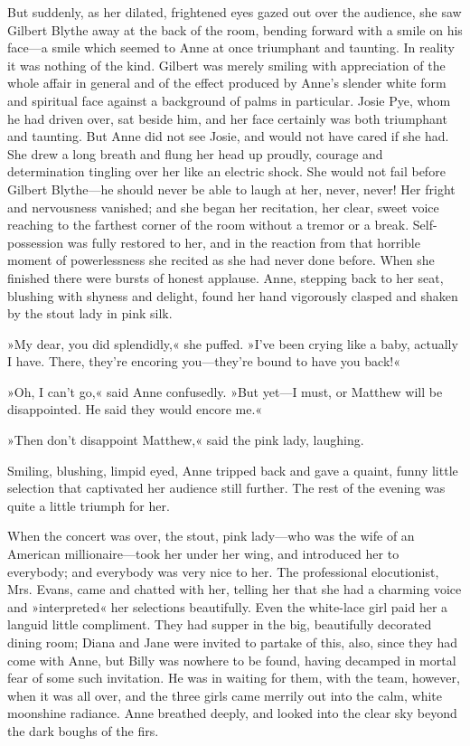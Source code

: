 But suddenly, as her dilated, frightened eyes gazed out over the audience, she saw Gilbert Blythe away at the back of the room, bending forward with a smile on his face—a smile which seemed to Anne at once triumphant and taunting. In reality it was nothing of the kind. Gilbert was merely smiling with appreciation of the whole affair in general and of the effect produced by Anne's slender white form and spiritual face against a background of palms in particular. Josie Pye, whom he had driven over, sat beside him, and her face certainly was both triumphant and taunting. But Anne did not see Josie, and would not have cared if she had. She drew a long breath and flung her head up proudly, courage and determination tingling over her like an electric shock. She would not fail before Gilbert Blythe—he should never be able to laugh at her, never, never! Her fright and nervousness vanished; and she began her recitation, her clear, sweet voice reaching to the farthest corner of the room without a tremor or a break. Self-possession was fully restored to her, and in the reaction from that horrible moment of powerlessness she recited as she had never done before. When she finished there were bursts of honest applause. Anne, stepping back to her seat, blushing with shyness and delight, found her hand vigorously clasped and shaken by the stout lady in pink silk.

»My dear, you did splendidly,« she puffed. »I've been crying like a baby, actually I have. There, they're encoring you—they're bound to have you back!«

»Oh, I can't go,« said Anne confusedly. »But yet—I must, or Matthew will be disappointed. He said they would encore me.«

»Then don't disappoint Matthew,« said the pink lady, laughing.

Smiling, blushing, limpid eyed, Anne tripped back and gave a quaint, funny little selection that captivated her audience still further. The rest of the evening was quite a little triumph for her.

When the concert was over, the stout, pink lady—who was the wife of an American millionaire—took her under her wing, and introduced her to everybody; and everybody was very nice to her. The professional elocutionist, Mrs. Evans, came and chatted with her, telling her that she had a charming voice and »interpreted« her selections beautifully. Even the white-lace girl paid her a languid little compliment. They had supper in the big, beautifully decorated dining room; Diana and Jane were invited to partake of this, also, since they had come with Anne, but Billy was nowhere to be found, having decamped in mortal fear of some such invitation. He was in waiting for them, with the team, however, when it was all over, and the three girls came merrily out into the calm, white moonshine radiance. Anne breathed deeply, and looked into the clear sky beyond the dark boughs of the firs.

